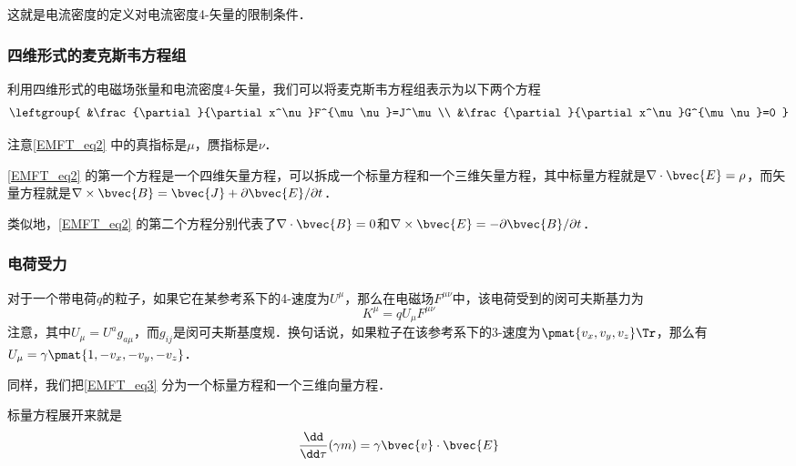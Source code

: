 这就是电流密度的定义对电流密度4-矢量的限制条件．


\subsubsection{四维形式的麦克斯韦方程组}

利用四维形式的电磁场张量和电流密度4-矢量，我们可以将麦克斯韦方程组表示为以下两个方程
\begin{equation}\label{EMFT_eq2}
\leftgroup{
    &\frac{\partial}{\partial x^\nu}F^{\mu\nu}=J^\mu\\
    &\frac{\partial}{\partial x^\nu}G^{\mu\nu}=0
}
\end{equation}

注意\autoref{EMFT_eq2} 中的真指标是$\mu$，赝指标是$\nu$．

\autoref{EMFT_eq2} 的第一个方程是一个四维矢量方程，可以拆成一个标量方程和一个三维矢量方程，其中标量方程就是$\nabla\cdot\bvec{E}=\rho$，而矢量方程就是$\nabla\times\bvec{B}=\bvec{J}+\partial\bvec{E}/\partial t$． 

类似地，\autoref{EMFT_eq2} 的第二个方程分别代表了$\nabla\cdot\bvec{B}=0$和$\nabla\times\bvec{E}=-\partial\bvec{B}/\partial t$．

\subsubsection{电荷受力}

对于一个带电荷$q$的粒子，如果它在某参考系下的4-速度为$U^\mu$，那么在电磁场$F^{\mu\nu}$中，该电荷受到的闵可夫斯基力为
\begin{equation}\label{EMFT_eq3}
K^{\mu}=qU_\mu F^{\mu\nu}
\end{equation}
注意，其中$U_\mu=U^ag_{a\mu}$，而$g_{ij}$是闵可夫斯基度规．换句话说，如果粒子在该参考系下的3-速度为$\pmat{v_x, v_y, v_z}\Tr$，那么有$U_\mu=\gamma\pmat{1, -v_x, -v_y, -v_z}$．

同样，我们把\autoref{EMFT_eq3} 分为一个标量方程和一个三维向量方程．

标量方程展开来就是
\begin{equation}
\frac{\dd}{\dd\tau}(\gamma m)=\gamma \bvec{v}\cdot\bvec{E}
\end{equation}




